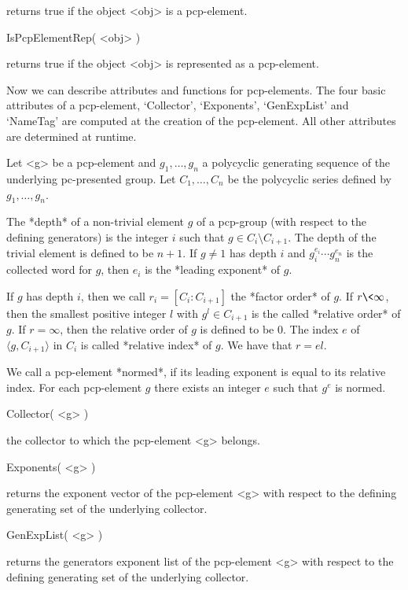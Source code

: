 returns true if the object <obj> is a pcp-element.

\>IsPcpElementRep( <obj> )

returns true if the object <obj> is represented as a pcp-element.


Now we can describe attributes and functions for pcp-elements. The
four basic attributes of a pcp-element, `Collector', `Exponents',
`GenExpList' and `NameTag' are computed at the creation of the
pcp-element. All other attributes are determined at runtime.

Let <g> be a pcp-element and $g_1, \ldots, g_n$ a polycyclic generating
sequence of the underlying pc-presented group. Let $C_1, \ldots, C_n$
be the polycyclic series defined by $g_1, \ldots, g_n$.

The *depth* of a non-trivial element $g$ of  a pcp-group (with respect 
to the defining generators) is the integer $i$ such that $g \in C_i  
\setminus C_{i+1}$. The depth  of the trivial element is defined to 
be $n+1$. If $g\not=1$ has depth $i$ and $g_i^{e_i} \cdots g_n^{e_n}$
is the collected word for $g$, then $e_i$ is the *leading exponent* of
$g$.

If  $g$ has  depth $i$, then we call $r_i = [C_i:C_{i+1}]$ the *factor
order* of $g$. If $r\<\infty$, then the  smallest positive integer $l$
with $g^l  \in C_{i+1}$  is the called  *relative  order* of  $g$.  If
$r=\infty$, then the relative order  of $g$ is defined  to be $0$. The
index $e$   of $\langle g,C_{i+1}\rangle$  in  $C_i$ is called *relative  
index*   of  $g$.   We   have that   $r  =  el$. 

We  call a pcp-element *normed*, if its leading  exponent is equal to
its relative index. For  each pcp-element $g$  there exists an integer
$e$  such   that $g^e$  is  normed.  

\bigskip

\> Collector( <g> )

the collector to  which the pcp-element  <g> belongs.

\>Exponents( <g> )

returns the exponent vector of the pcp-element <g> with respect to the defining
generating set of the underlying collector.

\>GenExpList( <g> )

returns the generators  exponent  list  of the  pcp-element  <g> with respect to 
the defining generating set of the underlying collector.


